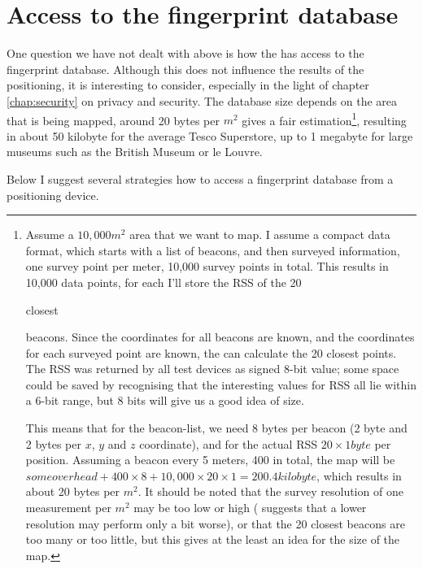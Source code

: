 \section{Access to the fingerprint database}
\label{sec:architecture-database}
One question we have not dealt with above is how the \device has access to the fingerprint database.
Although this does not influence the results of the positioning, it is interesting to consider, especially in the light of chapter \ref{chap:security} on privacy and security.
The database size depends on the area that is being mapped, around 20 bytes per $m^2$ gives a fair estimation\footnote{Assume a $10,000m^2$ area that we want to map.
    I assume a compact data format, which starts with a list of beacons, and then surveyed information, one survey point per meter, 10,000 survey points in total.
    This results in 10,000 data points, for each I'll store the RSS of the 20 \begin{em}closest\end{em} beacons.
    Since the coordinates for all beacons are known, and the coordinates for each surveyed point are known, the \device can calculate the 20 closest points.
    The RSS was returned by all test devices as signed 8-bit value; some space could be saved by recognising that the interesting values for RSS all lie within a 6-bit range, but 8 bits will give us a good idea of size.

    This means that for the beacon-list, we need 8 bytes per beacon (2 byte \bid and 2 bytes per $x$, $y$ and $z$ coordinate), and for the actual RSS $20 \times 1 byte$ per position.
    Assuming a beacon every 5 meters, 400 in total, the map will be $some overhead + 400 \times 8 + 10,000 \times 20 \times 1 = 200.4 kilobyte$, which results in about 20 bytes per $m^2$.
    It should be noted that the survey resolution of one measurement per $m^2$ may be too low or high ( suggests that a lower resolution may perform only a bit worse), or that the 20 closest beacons are too many or too little, but this gives at the least an idea for the size of the map.
}, resulting in about 50 kilobyte for the average Tesco Superstore, up to 1 megabyte for large museums such as the British Museum or le Louvre.

Below I suggest several strategies how to access a fingerprint database from a positioning device.

